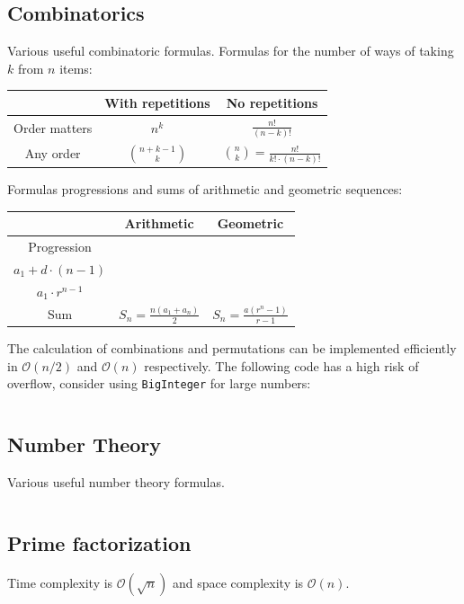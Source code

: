 \documentclass[8pt,a4paper,landscape,oneside]{amsart}
\newcommand{\code}[1]{\inputminted[fontsize=\normalsize,baselinestretch=1]{java}{code/#1}}
\newcommand{\codePy}[1]{\inputminted[fontsize=\normalsize,baselinestretch=1]{python}{code/#1}}
\newcommand{\bigO}{\mathcal{O}}
\begin{document}
\begin{multicols*}{3}
  \subsection{Combinatorics}
  Various useful combinatoric formulas.
  Formulas for the number of ways of taking $k$ from $n$ items:
  \begin{center}
  \begin{tabular}{|c|c|c|} \hline
  & With repetitions & No repetitions \\
  \hline
  Order matters & $n^k$ & $\frac{n!}{(n-k)!}$ \\ \hline
  Any order & $\binom{n+k-1}{k}$ & $\binom{n}{k} = \frac{n!}{k!\cdot(n-k)!}$ \\ \hline
  \end{tabular}
  \end{center}
  Formulas progressions and sums of arithmetic and geometric sequences:
  \begin{center}
  \begin{tabular}{|c|c|c|} \hline
  & Arithmetic & Geometric \\
  \hline
  Progression & \shortstack{$a_n = a_{n-1} + d =$ \\ $a_1 + d\cdot(n-1)$} & \shortstack{$a_n = a_{n-1}\cdot r =$ \\ $a_1\cdot r^{n-1}$} \\ \hline
  Sum & $S_n = \frac{n(a_1+a_n)}{2}$ & $S_n = \frac{a(r^n-1)}{r-1}$ \\ \hline
  \end{tabular}
  \end{center}
  
  The calculation of combinations and permutations can be implemented efficiently in $\bigO(n/2)$ and $\bigO(n)$ respectively. The following code has a high risk of overflow, consider using \texttt{BigInteger} for large numbers:
  \code{Math/Combinatorics.java}
  
  \subsection{Number Theory}
  Various useful number theory formulas.
  \code{Math/Gcd.java}
  
  \subsection{Prime factorization}
  Time complexity is $\bigO(\sqrt{n})$ and space complexity is $\bigO(n)$.
  \codePy{Math/Primes.py}
  

\end{multicols*}
\end{document}
